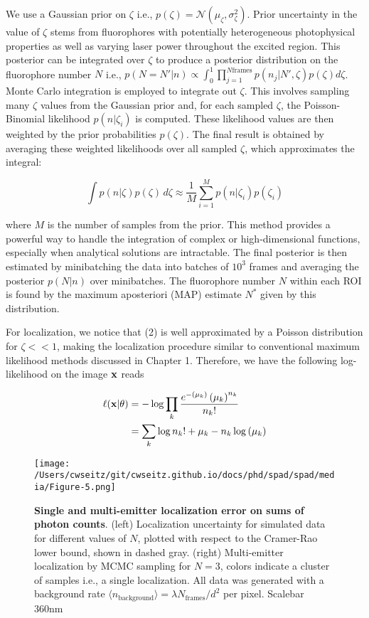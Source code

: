 We use a Gaussian prior on $\zeta$ i.e., $p(\zeta) = \mathcal{N}(\mu_{\zeta},\sigma_{\zeta}^2)$. Prior uncertainty in the value of $\zeta$ stems from fluorophores with potentially heterogeneous photophysical properties as well as varying laser power throughout the excited region. This posterior can be integrated over $\zeta$ to produce a posterior distribution on the fluorophore number $N$ i.e., $p(N=N'\lvert n) \propto \int_{0}^{1} \prod_{j=1}^{N\mathrm{frames}} p(n_{j}\lvert N',\zeta)p(\zeta) d\zeta$. Monte Carlo integration is employed to integrate out $\zeta$. This involves sampling many $\zeta$ values from the Gaussian prior and, for each sampled $\zeta$, the Poisson-Binomial likelihood $p(n\lvert\zeta_i)$ is computed. These likelihood values are then weighted by the prior probabilities $p(\zeta)$. The final result is obtained by averaging these weighted likelihoods over all sampled $\zeta$, which approximates the integral:

\begin{equation*}
\int p(n\lvert\zeta) p(\zeta) \, d\zeta \approx \frac{1}{M} \sum_{i=1}^M p(n\lvert\zeta_i) p(\zeta_i)
\end{equation*}

where $M$ is the number of samples from the prior. This method provides a powerful way to handle the integration of complex or high-dimensional functions, especially when analytical solutions are intractable. The final posterior is then estimated by minibatching the data into batches of $10^3$ frames and averaging the posterior $p(N\lvert n)$ over minibatches. The fluorophore number $N$ within each ROI is found by the maximum aposteriori (MAP) estimate $N^{*}$ given by this distribution.

For localization, we notice that (2) is well approximated by a Poisson distribution for $\zeta << 1$, making the localization procedure similar to conventional maximum likelihood methods discussed in Chapter 1. Therefore, we have the following log-likelihood on the image $\bold{x}$ reads


\begin{align}
\ell(\bold{x}\lvert \theta) &= -\log \prod_{k} \frac{e^{-\left(\mu_{k}\right)}\left(\mu_{k}\right)^{n_k}}{n_k!}\\
&= \sum_{k}  \log n_k! + \mu_{k} - n_k\log\left(\mu_{k}\right)
\end{align}

\begin{figure*}[t]
\centering
\texttt{[image: /Users/cwseitz/git/cwseitz.github.io/docs/phd/spad/spad/media/Figure-5.png]}
\caption{\textbf{Single and multi-emitter localization error on sums of photon counts}. (left) Localization uncertainty for simulated data for different values of $N$, plotted with respect to the Cramer-Rao lower bound, shown in dashed gray. (right) Multi-emitter localization by MCMC sampling for $N=3$, colors indicate a cluster of samples i.e., a single localization. All data was generated with a background rate $\langle n_{\mathrm{background}} \rangle = \lambda N_{\mathrm{frames}}/d^{2}$ per pixel. Scalebar 360nm}
\label{fig:fig6}
\end{figure*}   

